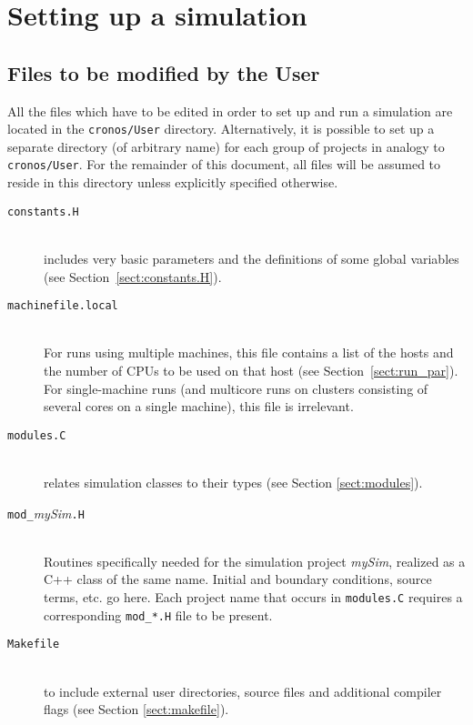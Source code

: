 \section{Setting up a simulation}

\subsection{Files to be modified by the User}
\label{sect:userfiles}

All the files which have to be edited in order to set up and run a
simulation are located in the {\tt cronos/User} directory. 
Alternatively, it is possible to set up a separate directory (of arbitrary
name) for each group of projects in analogy to {\tt cronos/User}.
For the remainder of this document, all files will be assumed to reside in
this directory unless explicitly specified otherwise.

\begin{description}

\item[{\tt constants.H}]{\ }\\
includes very basic parameters and the definitions of some global
variables (see Section~\ref{sect:constants.H}).

\item[{\tt machinefile.local}]{\ }\\
For runs using multiple machines, this file contains a list of the hosts
and the number of CPUs to be used on that host (see
Section~\ref{sect:run_par}). For single-machine runs (and multicore runs on
clusters consisting of several cores on a single machine), this file is
irrelevant.

\item[{\tt modules.C}]{\ }\\
relates simulation classes to their types (see Section
\ref{sect:modules}).

\item[{\tt mod\_}{\it mySim}{\tt .H}]{\ }\\
  Routines specifically needed for the simulation project {\it mySim},
  realized as a C++ class of the same name. Initial and boundary
  conditions, source terms, etc. go here. Each project name that
  occurs in {\tt modules.C} requires a corresponding
  \verb+mod_*.H+ file to be present.

\item[{\tt Makefile}]{\ }\\
  to include external user directories, source files and additional compiler flags (see Section
\ref{sect:makefile}).
  

\end{description}

